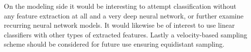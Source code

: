 On the modeling side it would be interesting to attempt classification without any feature extraction at all and a very deep neural network, or further examine recurring neural network models. It would likewise be of interest to use linear classifiers with other types of extracted features. Lastly a velocity-based sampling scheme should be considered for future use ensuring equidistant sampling.





